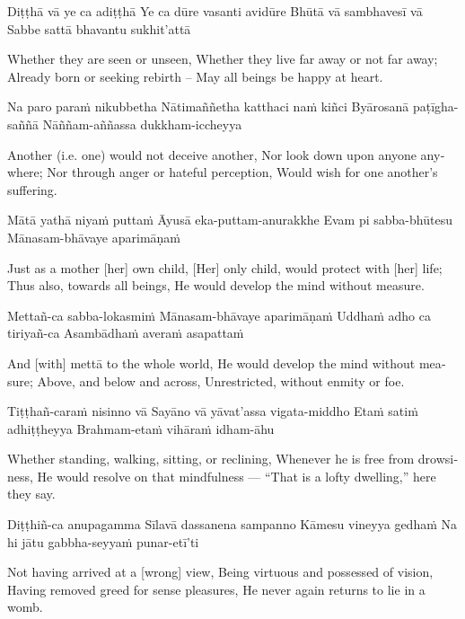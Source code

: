 \begin{english}
\begin{english}
Diṭṭhā vā ye ca adiṭṭhā
Ye ca dūre vasanti avidūre
Bhūtā vā sambhavesī vā
Sabbe sattā bhavantu sukhit’attā

\begin{english}
Whether they are seen or unseen,
Whether they live far away or not far away;
Already born or seeking rebirth –
May all beings be happy at heart.
\end{english}

Na paro paraṁ nikubbetha
Nātimaññetha katthaci naṁ kiñci
Byārosanā paṭīgha-saññā
Nāññam-aññassa dukkham-iccheyya

\begin{english}
Another (i.e. one) would not deceive another,
Nor look down upon anyone anywhere;
Nor through anger or hateful perception,
Would wish for one another’s suffering.
\end{english}

Mātā yathā niyaṁ puttaṁ
Āyusā eka-puttam-anurakkhe
Evam pi sabba-bhūtesu
Mānasam-bhāvaye aparimāṇaṁ

\begin{english}
Just as a mother [her] own child,
[Her] only child, would protect with [her] life;
Thus also, towards all beings,
He would develop the mind without measure.
\end{english}

Mettañ-ca sabba-lokasmiṁ
Mānasam-bhāvaye aparimāṇaṁ
Uddhaṁ adho ca tiriyañ-ca
Asambādhaṁ averaṁ asapattaṁ

\begin{english}
And [with] mettā to the whole world,
He would develop the mind without measure;
Above, and below and across,
Unrestricted, without enmity or foe.
\end{english}

Tiṭṭhañ-caraṁ nisinno vā
Sayāno vā yāvat’assa vigata-middho
Etaṁ satiṁ adhiṭṭheyya
Brahmam-etaṁ vihāraṁ idham-āhu

\begin{english}
Whether standing, walking, sitting, or reclining,
Whenever he is free from drowsiness,
He would resolve on that mindfulness —
“That is a lofty dwelling,” here they say.
\end{english}

Diṭṭhiñ-ca anupagamma
Sīlavā dassanena sampanno
Kāmesu vineyya gedhaṁ
Na hi jātu gabbha-seyyaṁ punar-etī’ti

\begin{english}
Not having arrived at a [wrong] view,
Being virtuous and possessed of vision,
Having removed greed for sense pleasures,
He never again returns to lie in a womb.
\end{english}


\end{english}
\end{english}
